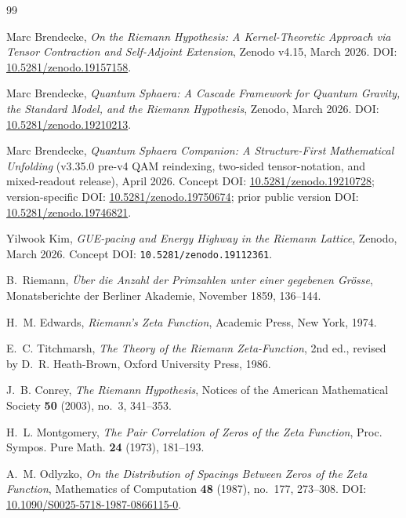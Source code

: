 \begin{thebibliography}{99}

Marc Brendecke,
\emph{On the Riemann Hypothesis: A Kernel-Theoretic Approach via Tensor Contraction and Self-Adjoint Extension},
Zenodo v4.15, March 2026.
\newblock DOI: \href{https://doi.org/10.5281/zenodo.19157158}{10.5281/zenodo.19157158}.

Marc Brendecke,
\emph{Quantum Sphaera: A Cascade Framework for Quantum Gravity, the Standard Model, and the Riemann Hypothesis},
Zenodo, March 2026.
\newblock DOI: \href{https://doi.org/10.5281/zenodo.19210213}{10.5281/zenodo.19210213}.

Marc Brendecke,
\emph{Quantum Sphaera Companion: A Structure-First Mathematical Unfolding} (v3.35.0 pre-v4 QAM reindexing, two-sided tensor-notation, and mixed-readout release),
April 2026.
\newblock Concept DOI: \href{https://doi.org/10.5281/zenodo.19210728}{10.5281/zenodo.19210728}; version-specific DOI: \href{https://doi.org/10.5281/zenodo.19750674}{10.5281/zenodo.19750674}; prior public version DOI: \href{https://doi.org/10.5281/zenodo.19746821}{10.5281/zenodo.19746821}.

Yilwook Kim,
\emph{GUE-pacing and Energy Highway in the Riemann Lattice},
Zenodo, March 2026.
\newblock Concept DOI: \texttt{10.5281/zenodo.19112361}.

B.~Riemann,
\emph{\"Uber die Anzahl der Primzahlen unter einer gegebenen Gr\"osse},
Monatsberichte der Berliner Akademie, November 1859, 136--144.

H.~M. Edwards,
\emph{Riemann's Zeta Function},
Academic Press, New York, 1974.

E.~C. Titchmarsh,
\emph{The Theory of the Riemann Zeta-Function},
2nd ed., revised by D.~R. Heath-Brown,
Oxford University Press, 1986.

J.~B. Conrey,
\emph{The Riemann Hypothesis},
Notices of the American Mathematical Society \textbf{50} (2003), no.~3, 341--353.

H.~L. Montgomery,
\emph{The Pair Correlation of Zeros of the Zeta Function},
Proc. Sympos. Pure Math. \textbf{24} (1973), 181--193.

A.~M. Odlyzko,
\emph{On the Distribution of Spacings Between Zeros of the Zeta Function},
Mathematics of Computation \textbf{48} (1987), no.~177, 273--308.
\newblock DOI: \href{https://doi.org/10.1090/S0025-5718-1987-0866115-0}{10.1090/S0025-5718-1987-0866115-0}.


\end{thebibliography}
